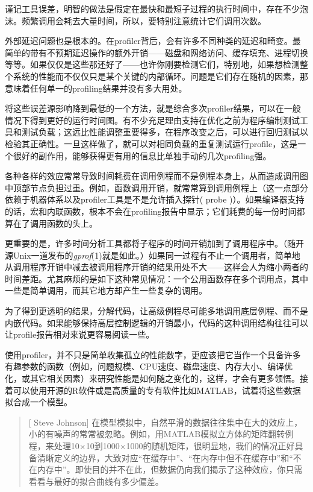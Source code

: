 \documentclass[12pt,oneside]{book}
\begin{document}
\begin{common-format}
谨记工具误差，明智的做法是假定在最快和最短子过程的执行时间中，存在不少泡沫。频繁调用会耗去大量时间，所以，要特别注意统计它们调用次数。

外部延迟问题也是根本的。在profiler背后，会有许多不同种类的延迟和畸变。最简单的带有不预期延迟操作的额外开销——磁盘和网络访问、缓存填充、进程切换等等。如果仅仅是这些那还好了——也许你刚要检测它们，特别地，如果想检测整个系统的性能而不仅仅只是某个关键的内部循环。问题是它们存在随机的因素，那意味着任何单一的profiling结果并没有多大用处。

将这些误差源影响降到最低的一个方法，就是综合多次profiler结果，可以在一般情况下得到更好的运行时间图。有不少充足理由支持在优化之前为程序编制测试工具和测试负载；这远比性能调整重要得多，在程序改变之后，可以进行回归测试以检验其正确性。一旦这样做了，就可以对相同负载的重复测试运行profile，这是一个很好的副作用，能够获得更有用的信息比单独手动的几次profiling强。

各种各样的效应常常导致时间耗费在调用例程而不是例程本身上，从而造成调用图中顶部节点负担过重。例如，函数调用开销，就常常算到调用例程上（这一点部分依赖于机器体系以及profiler工具是不是允许插入探针( probe )）。如果编译器支持的话，宏和内联函数，根本不会在profiling报告中显示；它们耗费的每一份时间都算在了调用函数的头上。

更重要的是，许多时间分析工具都将子程序的时间开销加到了调用程序中。（随开源Unix一道发布的\textit{gprof}(1)就是如此。）如果同一过程有不止一个调用者，简单地从调用程序开销中减去被调用程序开销的结果用处不大——这样会人为缩小两者的时间差距。尤其麻烦的是如下这种常见情况：一个公用函数存在多个调用点，其中一些是简单调用，而其它地方却产生一些复杂的调用。

为了得到更透明的结果，分解代码，让高级例程尽可能多地调用底层例程、而不是内嵌代码。如果能够保持高层控制逻辑的开销最小，代码的这种调用结构往往可以让profile报告相对来说更容易阅读一些。

使用profiler，并不只是简单收集孤立的性能数字，更应该把它当作一个具备许多有趣参数的函数（例如，问题规模、CPU速度、磁盘速度、内存大小、编译优化，或其它相关因素）来研究性能是如何随之变化的，这样，才会有更多领悟。接着可以使用开源的R软件或是高质量的专有软件比如MATLAB，试着将这些数据拟合成一个模型。

\begin{quote}[ Steve Johnson]
在模型模拟中，自然平滑的数据往往集中在大的效应上，小的有噪声的常常被忽略。例如，用MATLAB模拟立方体的矩阵翻转例程，来处理10×10到1000×1000的随机矩阵，很明显地，我们的情况正好具备清晰定义的边界，大致对应“在缓存中”、“在内存中但不在缓存中”和“不在内存中”。即使目的并不在此，但数据仍向我们揭示了这种效应，你只需看看与最好的拟合曲线有多少偏差。
\end{quote}


\end{common-format}
\end{document}

